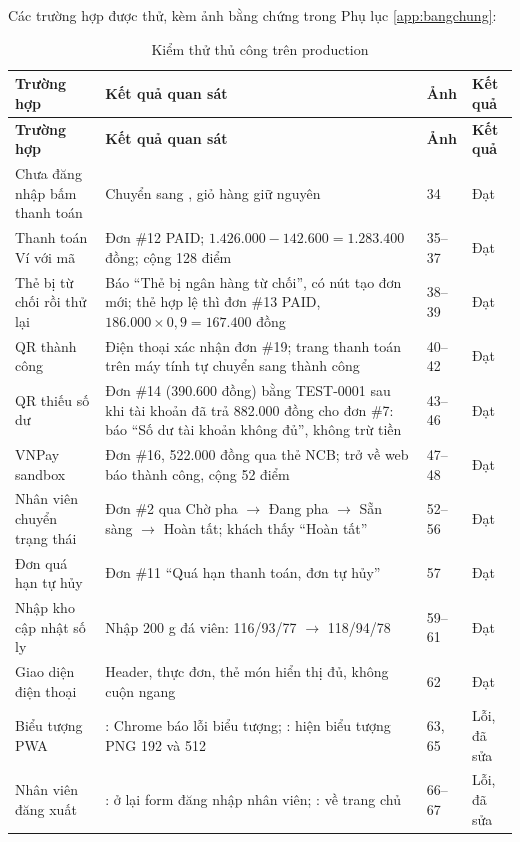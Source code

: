 Các trường hợp được thử, kèm ảnh bằng chứng trong Phụ lục \ref{app:bangchung}:

\begin{longtable}{@{}L{4.6cm}L{6.2cm}L{1.6cm}L{1.4cm}@{}}
\caption{Kiểm thử thủ công trên production}\label{tab:thucong}\\
\toprule
\textbf{Trường hợp} & \textbf{Kết quả quan sát} & \textbf{Ảnh} & \textbf{Kết quả} \\ \midrule \endfirsthead
\toprule \textbf{Trường hợp} & \textbf{Kết quả quan sát} & \textbf{Ảnh} & \textbf{Kết quả} \\ \midrule \endhead
\bottomrule \endfoot
Chưa đăng nhập bấm thanh toán & Chuyển sang , giỏ hàng giữ nguyên & 34 & Đạt \\
Thanh toán Ví với mã  & Đơn \#12 PAID; $1.426.000 - 142.600 = 1.283.400$ đồng; cộng 128 điểm & 35--37 & Đạt \\
Thẻ bị từ chối rồi thử lại & Báo ``Thẻ bị ngân hàng từ chối'', có nút tạo đơn mới; thẻ hợp lệ thì đơn \#13 PAID, $186.000 \times 0{,}9 = 167.400$ đồng & 38--39 & Đạt \\
QR thành công & Điện thoại xác nhận đơn \#19; trang thanh toán trên máy tính tự chuyển sang thành công & 40--42 & Đạt \\
QR thiếu số dư & Đơn \#14 (390.600 đồng) bằng TEST-0001 sau khi tài khoản đã trả 882.000 đồng cho đơn \#7: báo ``Số dư tài khoản không đủ'', không trừ tiền & 43--46 & Đạt \\
VNPay sandbox & Đơn \#16, 522.000 đồng qua thẻ NCB; trở về web báo thành công, cộng 52 điểm & 47--48 & Đạt \\
Nhân viên chuyển trạng thái & Đơn \#2 qua Chờ pha $\rightarrow$ Đang pha $\rightarrow$ Sẵn sàng $\rightarrow$ Hoàn tất; khách thấy ``Hoàn tất'' & 52--56 & Đạt \\
Đơn quá hạn tự hủy & Đơn \#11 ``Quá hạn thanh toán, đơn tự hủy'' & 57 & Đạt \\
Nhập kho cập nhật số ly & Nhập 200 g đá viên: 116/93/77 $\rightarrow$ 118/94/78 & 59--61 & Đạt \\
Giao diện điện thoại & Header, thực đơn, thẻ món hiển thị đủ, không cuộn ngang & 62 & Đạt \\
Biểu tượng PWA & : Chrome báo lỗi biểu tượng; : hiện biểu tượng PNG 192 và 512 & 63, 65 & Lỗi, đã sửa \\
Nhân viên đăng xuất & : ở lại form đăng nhập nhân viên; : về trang chủ & 66--67 & Lỗi, đã sửa \\
\end{longtable}
